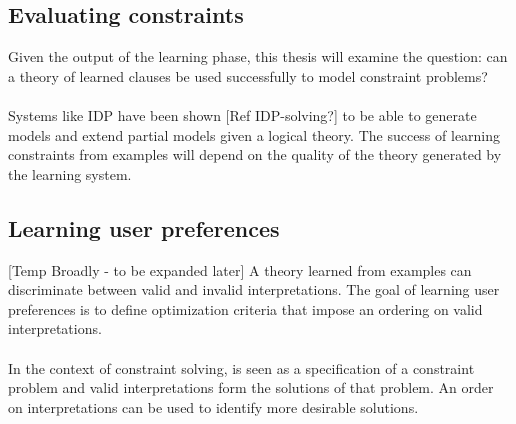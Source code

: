 \subsection{Evaluating constraints}
Given the output of the learning phase, this thesis will examine the question: can a theory  of learned clauses be used successfully to model constraint problems? 
\\\\
Systems like IDP have been shown [Ref IDP-solving?] to be able to generate models and extend partial models given a logical theory. The success of learning constraints from examples will depend on the quality of the theory generated by the learning system.

\subsection{Learning user preferences}
[Temp Broadly - to be expanded later] A theory  learned from examples can discriminate between valid and invalid interpretations. The goal of learning user preferences is to define optimization criteria that impose an ordering on valid interpretations.
\\\\
In the context of constraint solving,  is seen as a specification of a constraint problem and valid interpretations form the solutions of that problem. An order on interpretations can be used to identify more desirable solutions.
